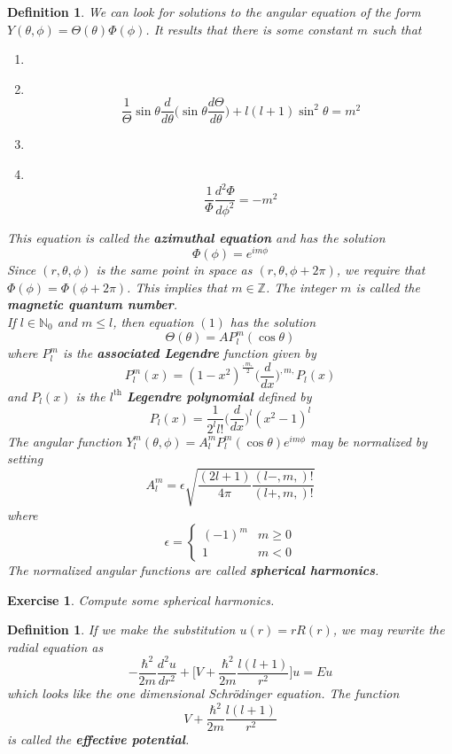 \documentclass[12pt]{amsart}
\newtheorem{defn}[thm]{Definition}
\newtheorem{ex}[thm]{Exercise}
\newcommand{\sch}{Schr\"{o}dinger }
\newcommand\Item[1][]{%
  \ifx\relax#1\relax  \item \else \item[#1] \fi
  \abovedisplayskip=0pt\abovedisplayshortskip=0pt~\vspace*{-\baselineskip}}
\newcommand{\ep}{\epsilon}
\newcommand{\N}{\mathbb{N}}
\newcommand{\Z}{\mathbb{Z}}
\begin{document}
\begin{defn}
We can look for solutions to the angular equation of the form \\$Y(\theta, \phi) = \Theta(\theta)\Phi(\phi)$. It results that there is some constant $m$ such that 
\begin{enumerate}
\Item 
$$\frac{1}{\Theta}  \sin \theta \frac{d}{d\theta}\bigg( \sin \theta \frac{d\Theta}{d\theta} \bigg) + l (l+1) \sin^2 \theta = m^2$$
\vspace{3mm}
\Item $$\frac{1}{\Phi} \frac{d^2 \Phi}{d\phi^2} = -m^2$$
\end{enumerate} \vspace{3mm}
This equation is called the \textbf{azimuthal equation} and has the solution $$\Phi(\phi) = e^{im\phi}$$
Since $(r,\theta, \phi)$ is the same point in space as $(r, \theta, \phi+2 \pi)$, we require that $\Phi(\phi) = \Phi(\phi+2\pi)$. This implies that $m \in \Z$. The integer $m$ is called the \textbf{magnetic quantum number}. \vspace{3mm}\\ 
If $l \in \N_0$ and $m \leq l$, then equation $(1)$ has the solution $$\Theta(\theta) = AP_l^m(\cos \theta)$$ where $P_l^m$ is the \textbf{associated Legendre} function given by $$P_l^m(x) = (1-x^2)^{\frac{, m ,}{2}}\bigg(\frac{d}{dx} \bigg)^{, m ,} P_l(x)$$ and $P_l(x)$ is the $l^{\text{th}}$ \textbf{Legendre polynomial} defined by $$P_l(x) = \frac{1}{2^l l!} \bigg(\frac{d}{dx} \bigg)^{l}(x^2 -1)^l$$ \vspace{3mm} The angular function $Y^m_l(\theta, \phi) = A_l^m P_l^m(\cos \theta)e^{im\phi}$ may be normalized by setting $$A_l^m = \ep \sqrt{\frac{(2l+1)}{4\pi} \frac{(l-, m ,)!}{(l+ , m ,)!}}$$ where $$\ep = 
\begin{cases}
(-1)^m & m \geq 0\\
1 & m < 0
\end{cases}$$ The normalized angular functions are called \textbf{spherical harmonics}.
\end{defn}

\begin{ex}
Compute some spherical harmonics.
\end{ex}

\begin{defn}
If we make the substitution $u(r) = rR(r)$, we may rewrite the radial equation as $$-\frac{\hbar^2}{2m}\frac{d^2u}{dr^2} + \bigg[V+ \frac{\hbar^2}{2m}\frac{l(l+1)}{r^2} \bigg]u = Eu$$ which looks like the one dimensional \sch equation. The function $$V+ \frac{\hbar^2}{2m}\frac{l(l+1)}{r^2}$$ is called the \textbf{effective potential}.
\end{defn}
\newpage
\end{document}
